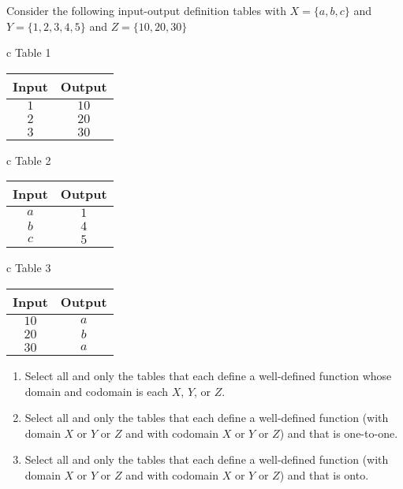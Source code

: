 Consider the following input-output definition tables with $X = \{ a,b,c\}$ and 
$Y = \{ 1, 2, 3, 4, 5\}$ and $Z = \{ 10, 20, 30 \}$

\begin{center}
\begin{multicols}{3}
\begin{tabular}{c}
Table 1\\
 \begin{tabular}{c|c}
Input & Output \\
\hline
$1$ & $10$ \\
$2$ & $20$ \\
$3$ & $30$ \\
\end{tabular}\end{tabular}
\columnbreak
\begin{tabular}{c}
Table 2\\ 
\begin{tabular}{c|c}
Input & Output \\
\hline
$a$ & $1$ \\
$b$ & $4$ \\
$c$ & $5$ \\
\end{tabular}\end{tabular}
\columnbreak
\begin{tabular}{c}
Table 3\\ 
\begin{tabular}{c|c}
Input & Output \\
\hline
$10$ & $a$ \\
$20$ & $b$ \\
$30$ & $a$ \\
\end{tabular}\end{tabular}
\end{multicols}
\end{center}

\begin{enumerate}
\item Select all and only the tables that each define a well-defined function 
whose domain and codomain 
is each $X$, $Y$, or $Z$.
\item Select all and only the tables that each define a well-defined function 
(with domain $X$ or $Y$ or $Z$ and 
with codomain $X$ or $Y$ or $Z$) and that is one-to-one.
\item Select all and only the tables that each define a well-defined function 
(with domain $X$ or $Y$ or $Z$ and 
with codomain $X$ or $Y$ or $Z$) and that is onto.
\end{enumerate}